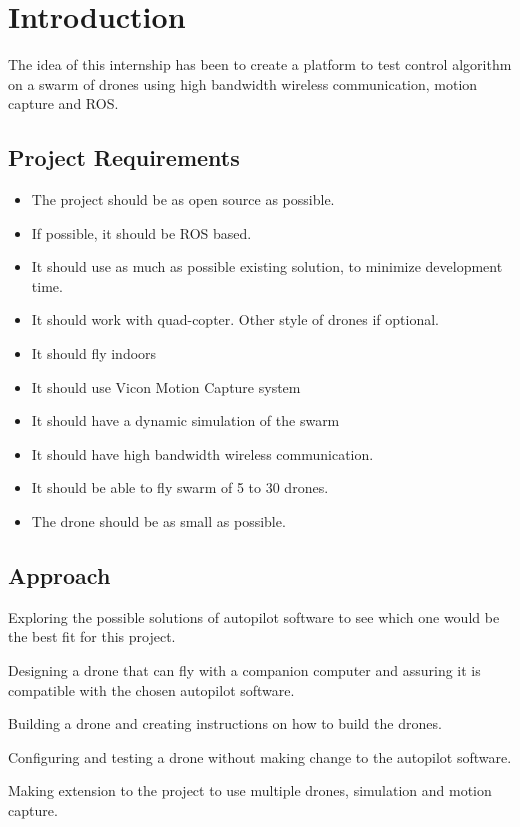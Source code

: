 \chapter{Introduction}

The idea of this internship has been to create a platform to test control algorithm on a swarm of drones using high bandwidth wireless communication, motion capture and ROS.

\section{Project Requirements}
\begin{itemize}
    \item The project should be as open source as possible.
    \item If possible, it should be ROS based.
    \item It should use as much as possible existing solution, to minimize development time.
    \item It should work with quad-copter. Other style of drones if optional.
    \item It should fly indoors
    \item It should use Vicon Motion Capture system
    \item It should have a dynamic simulation of the swarm
    \item It should have high bandwidth wireless communication.
    \item It should be able to fly swarm of 5 to 30 drones.
    \item The drone should be as small as possible.
\end{itemize}

\section{Approach}
Exploring the possible solutions of autopilot software to see which one would be the best fit for this project.

Designing a drone that can fly with a companion computer and assuring it is compatible with the chosen autopilot software.

Building a drone and creating instructions on how to build the drones.

Configuring and testing a drone without making change to the autopilot software.

Making extension to the project to use multiple drones, simulation and motion capture.
